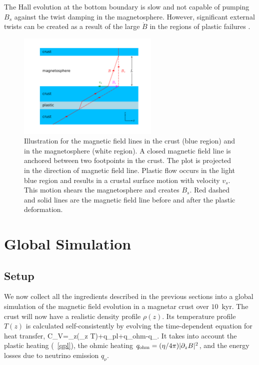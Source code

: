 The Hall evolution at the bottom boundary is slow and not capable of pumping 
$B_s$ against the twist damping in the magnetosphere. 
However, significant external twists can 
be created as a result of the large $\dot{B}$ in the regions of plastic 
failures \citep{2014ApJ...794L..24B}. 

\begin{figure}[t]
\centering
\includegraphics[width=0.6\textwidth]{pics/chap2/twist.pdf} 
\caption[Illustration for the magnetic field lines in the crust and in the 
magnetosphere]{Illustration for the magnetic field lines in the crust (blue region) and in the 
magnetosphere (white region). 
A closed magnetic field line is anchored between two footpoints in the crust. The plot is projected in the direction of magnetic field line.
Plastic flow 
occurs
in the light blue region and 
results in a crustal surface motion
with velocity $v_s$. This motion shears the magnetosphere 
and creates $B_s$.
Red dashed and solid lines are the magnetic field line before and after 
the plastic deformation. 
}
\label{fig:twist}
\end{figure}

\section{Global Simulation}
\label{sim}

\subsection{Setup}

We now collect all the ingredients described in the previous sections into a 
global simulation of the magnetic field evolution in a magnetar crust over $10$~kyr.
The crust will now have a realistic density profile $\rho(z)$. Its temperature profile $T(z)$ is calculated self-consistently by evolving the time-dependent equation for heat transfer,
\beq\label{heat}
 C_V=\partial_z\left(\kappa \partial_z T\right)+q_{\rm pl}+q_{\rm ohm}-q_{\nu}.
 \eeq
It takes into account the plastic heating (\Eq~\ref{qpl}), the ohmic heating $q_{\rm ohm}=(\eta/4\pi)|\partial_zB|^2$, and the energy losses due to neutrino emission $q_\nu$.

